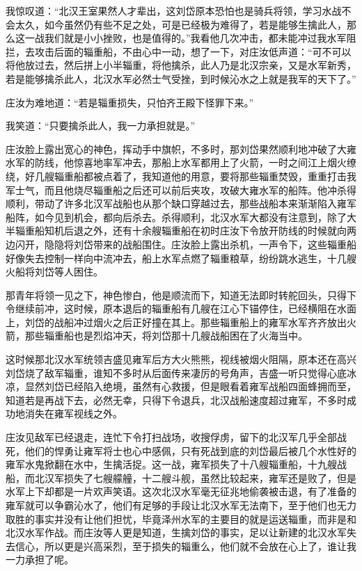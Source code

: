 我惊叹道：“北汉王室果然人才辈出，这刘岱原本恐怕也是骑兵将领，学习水战不会太久，如今虽然仍有些不足之处，可是已经极为难得了，若是能够生擒此人，那么这一战我们就是小小挫败，也是值得的。”我看他几次冲击，都未能冲过我水军阻拦，去攻击后面的辎重船，不由心中一动，想了一下，对庄汝低声道：“可不可以将他放过去，然后拼上小半辎重，将他擒杀，此人乃是北汉宗亲，又是水军新秀，若是能够擒杀此人，北汉水军必然士气受挫，到时候沁水之上就是我军的天下了。”

庄汝为难地道：“若是辎重损失，只怕齐王殿下怪罪下来。”

我笑道：“只要擒杀此人，我一力承担就是。”

庄汝脸上露出宽心的神色，挥动手中旗帜，不多时，那刘岱果然顺利地冲破了大雍水军的防线，他惊喜地率军冲去，那船上水军都用上了火箭，一时之间江上烟火缭绕，好几艘辎重船都被点着了，我知道他的用意，要将那些辎重焚毁，重重打击我军士气，而且他烧尽辎重船之后还可以前后夹攻，攻破大雍水军的船阵。他冲杀得顺利，带动了许多北汉军战船也从那个缺口穿越过去，那些战船本来渐渐陷入雍军船阵，如今见到机会，都向后杀去。杀得顺利，北汉水军大都没有注意到，除了大半辎重船知机后退之外，还有十余艘辎重船在初时庄汝下令放开防线的时候就向两边闪开，隐隐将刘岱带来的战船围住。庄汝脸上露出杀机，一声令下，这些辎重船好像失去控制一样向中流冲去，船上水军点燃了辎重粮草，纷纷跳水逃生，十几艘火船将刘岱等人困住。

那青年将领一见之下，神色惨白，他是顺流而下，知道无法即时转舵回头，只得下令继续前冲，这时候，原本退后的辎重船有几艘在江心下锚停住，已经横阻在水面上，刘岱的战船冲过烟火之后正好撞在其上。那些辎重船上的雍军水军齐齐放出火箭，那些辎重船也是烈焰冲天，将刘岱那十几艘战船困在了火海当中。

这时候那北汉水军统领吉盛见雍军后方大火熊熊，视线被烟火阻隔，原本还在高兴刘岱烧了敌军辎重，谁知不多时从后面传来凄厉的号角声，吉盛一听只觉得心底冰凉，显然刘岱已经陷入绝境，虽然有心救援，但是眼看着雍军战船四面蜂拥而至，知道若是再战下去，必然无幸，只得下令退兵，北汉战船速度超过雍军，不多时成功地消失在雍军视线之外。

庄汝见敌军已经退走，连忙下令打扫战场，收搜俘虏，留下的北汉军几乎全部战死，他们的悍勇让雍军将士也心中感佩，只有死战到底的刘岱最后被几个水性好的雍军水鬼掀翻在水中，生擒活捉。这一战，雍军损失了十八艘辎重船，十九艘战船，而北汉军损失了七艘艨艟，十二艘斗舰，虽然比较起来，雍军还是败了，但是水军上下却都是一片欢声笑语。这次北汉水军毫无征兆地偷袭被击退，有了准备的雍军就可以争霸沁水了，他们有足够的手段让北汉水军无法南下，至于他们也无力取胜的事实并没有让他们担忧，毕竟泽州水军的主要目的就是运送辎重，而非是和北汉水军作战。而庄汝等人更是知道，生擒刘岱的事实，足以让新建的北汉水军失去信心，所以更是兴高采烈，至于损失的辎重么，他们就不会放在心上了，谁让我一力承担了呢。

